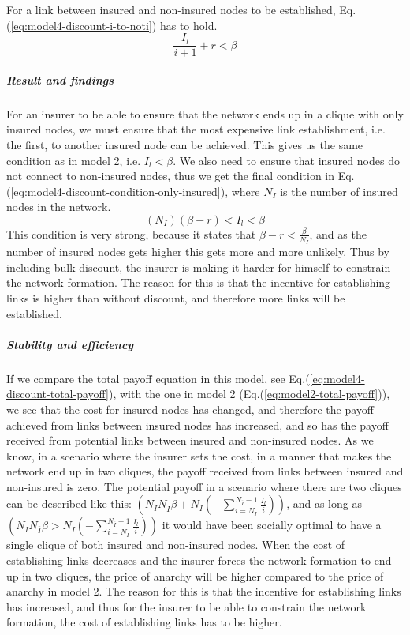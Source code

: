 For a link between insured and non-insured nodes to be established, Eq.(\ref{eq:model4-discount-i-to-noti}) has to hold.
\begin{equation}
\frac{I_{l}}{i+1}+r<\beta
\label{eq:model4-discount-i-to-noti}
\end{equation}
\subparagraph{Result and findings}
For an insurer to be able to ensure that the network ends up in a clique with only insured nodes, we must ensure that the most expensive link establishment, i.e. the first, to another insured node can be achieved. This gives us the same condition as in model 2, i.e. $I_{l}<\beta$. 
We also need to ensure that insured nodes do not connect to non-insured nodes, thus we get the final condition in Eq. (\ref{eq:model4-discount-condition-only-insured}), where $N_{I}$ is the number of insured nodes in the network.
\begin{equation}
(N_{I})(\beta-r)<I_{l}<\beta
\label{eq:model4-discount-condition-only-insured}
\end{equation}
This condition is very strong, because it states that $\beta-r<\frac{\beta}{N_{I}}$, and as the number of insured nodes gets higher this gets more and more unlikely. 
Thus by including bulk discount, the insurer is making it harder for himself to constrain the network formation. The reason for this is that the incentive for establishing links is higher than without discount, and therefore more links will be established.
\subparagraph{Stability and efficiency}
If we compare the total payoff equation in this model, see Eq.(\ref{eq:model4-discount-total-payoff}), with the one in model 2 (Eq.(\ref{eq:model2-total-payoff})), we see that the cost for insured nodes has changed, and therefore the payoff achieved from links between insured nodes has increased, and so has the  payoff received from potential links between insured and non-insured nodes. 
As we know, in a scenario where the insurer sets the cost, in a manner that makes the network end up in two cliques, the payoff received from links between insured and non-insured is zero. The potential payoff in a scenario where there are two cliques can be described like this: $(N_{I}N_{\overline{I}}\beta+N_{I}(-\sum_{i=N_{I}}^{N_{\overline{I}}-1}\frac{I_{l}}{i}))$, and as long as $(N_{I}N_{\overline{I}}\beta>N_{I}(-\sum_{i=N_{I}}^{N_{\overline{I}}-1}\frac{I_{l}}{i}))$ it would have been socially optimal to have a single clique of both insured and non-insured nodes.
When the cost of establishing links decreases and the insurer forces the network formation to end up in two cliques, the price of anarchy will be higher compared to the price of anarchy in model 2. 
The reason for this is that the incentive for establishing links has increased, and thus for the insurer to be able to constrain the network formation, the cost of establishing links has to be higher.

